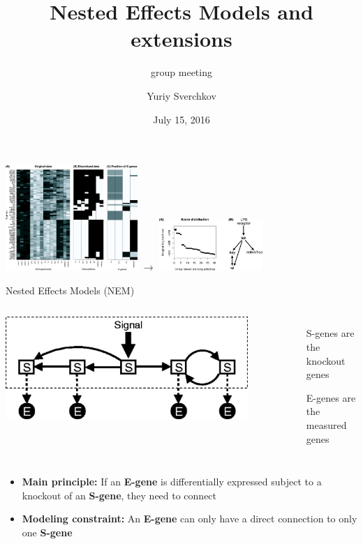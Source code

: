 \documentclass{beamer}
\title{Nested Effects Models and extensions}
\subtitle{group meeting}
\date{July 15, 2016}
\author{Yuriy Sverchkov}
\institute{University of Wisconsin--Madison}
\begin{document}
\begin{frame}[plain]
  \titlepage
\end{frame}

\begin{frame}[plain]
\includegraphics[valign=c,height=4cm,trim={0 0 22cm 0}, clip]{F3_large.jpg}
\hfill {\Huge $\rightarrow$} \hfill
\includegraphics[valign=c,height=2cm,trim={30cm 0 0 0}, clip]{F4_large.jpg}

\raggedleft \scriptsize \cite{Markowetz01012005}
\end{frame}

\begin{frame}{Nested Effects Models (NEM)}
\begin{columns}
\includegraphics[width=0.9\textwidth]{F1_large.jpg}

\begin{itemize}
  \item[S-genes] are the knockout genes
  \item[E-genes] are the measured genes
\end{itemize}
\end{columns}
\pause
\begin{itemize}
  \item \textbf{Main principle:} If an \textbf{E-gene} is differentially expressed subject to a knockout of an \textbf{S-gene}, they need to connect
  \item \textbf{Modeling constraint:} An \textbf{E-gene} can only have a direct connection to only one \textbf{S-gene}
\end{itemize}
\end{frame}
\end{document}
